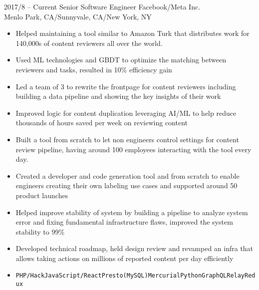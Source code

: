 \documentclass[9pt]{developercv} %
\begin{document}
\vspace{0.5cm}






\begin{entrylist}
	\entry
		{2017/8 -- Current}
		{Senior Software Engineer}
		{Facebook/Meta Inc.\\\footnotesize{Menlo Park, CA/Sunnyvale, CA/New York, NY}} 
		{
			\begin{itemize}[leftmargin=-0.0125in]
				\item Helped maintaining a tool similar to Amazon Turk that distributes work for 140,000s of content reviewers all over the world.
				\item Used ML technologies and GBDT to optimize the matching between reviewers and tasks, resulted in 10\% efficiency gain 
				\item Led a team of 3 to rewrite the frontpage for content reviewers including building a data pipeline and showing the key insights of their work
				\item Improved logic for content duplication leveraging AI/ML to help reduce thousands of hours saved per week on reviewing content
				\item Built a tool from scratch to let non engineers control settings for content review pipeline, having around 100 employees interacting with the tool every day.
				\item Created a developer and code generation tool and from scratch to enable engineers creating their own labeling use cases and supported around 50 product launches
				\item Helped improve stability of system by building a pipeline to analyze system error and fixing fundamental infrastructure flaws, improved the system stability to 99\%
				\item Developed technical roadmap, held design review and revamped an infra that allows taking actions on millions of reported content per day efficiently
				\item \texttt{PHP/Hack}\slashsep\texttt{JavaScript/React}\slashsep\texttt{Presto(MySQL)}\slashsep\texttt{Mercurial}\slashsep\texttt{Python}\slashsep\texttt{GraphQL}\slashsep\texttt{Relay}\slashsep\texttt{Redux}

\end{itemize}}
\end{entrylist}
\end{document}
